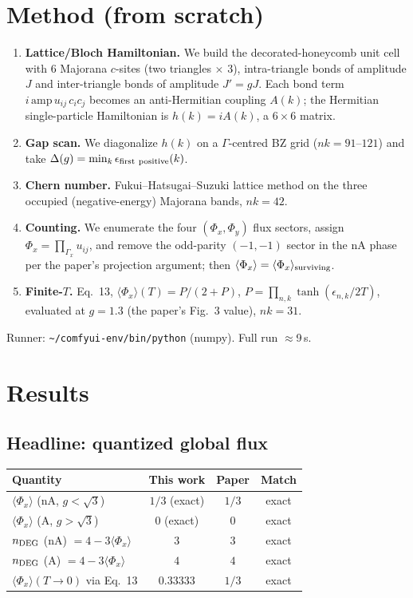 \documentclass[11pt]{article}
\begin{document}
\section{Method (from scratch)}
\begin{enumerate}
\item \textbf{Lattice/Bloch Hamiltonian.} We build the decorated-honeycomb unit
cell with 6 Majorana $c$-sites (two triangles $\times$ 3), intra-triangle bonds
of amplitude $J$ and inter-triangle bonds of amplitude $J'=gJ$. Each bond term
$i\,\text{amp}\,u_{ij}\,c_ic_j$ becomes an anti-Hermitian coupling $A(k)$; the
Hermitian single-particle Hamiltonian is $h(k)=iA(k)$, a $6\times6$ matrix.
\item \textbf{Gap scan.} We diagonalize $h(k)$ on a $\Gamma$-centred BZ grid
($nk=91$--$121$) and take $\Delta(g)=\min_k \epsilon_{\rm first\ positive}(k)$.
\item \textbf{Chern number.} Fukui--Hatsugai--Suzuki lattice method on the three
occupied (negative-energy) Majorana bands, $nk=42$.
\item \textbf{Counting.} We enumerate the four $(\Phi_x,\Phi_y)$ flux sectors,
assign $\Phi_x=\prod_{\Gamma_x}u_{ij}$, and remove the odd-parity $(-1,-1)$
sector in the nA phase per the paper's projection argument; then
$\langle\Phi_x\rangle=\langle\Phi_x\rangle_{\rm surviving}$.
\item \textbf{Finite-$T$.} Eq.~13,
$\langle\Phi_x\rangle(T)=P/(2+P)$, $P=\prod_{n,k}\tanh(\epsilon_{n,k}/2T)$,
evaluated at $g=1.3$ (the paper's Fig.~3 value), $nk=31$.
\end{enumerate}
Runner: \texttt{\~{}/comfyui-env/bin/python} (numpy). Full run $\approx$9\,s.

\section{Results}

\subsection*{Headline: quantized global flux}
\begin{table}[h]\centering
\begin{tabular}{lccc}
\toprule
Quantity & This work & Paper & Match \\
\midrule
$\langle\Phi_x\rangle$ (nA, $g<\sqrt3$) & $1/3$ (exact) & $1/3$ & exact \\
$\langle\Phi_x\rangle$ (A, $g>\sqrt3$)  & $0$ (exact)  & $0$   & exact \\
$n_{\rm DEG}$ (nA) $=4-3\langle\Phi_x\rangle$ & $3$ & $3$ & exact \\
$n_{\rm DEG}$ (A)  $=4-3\langle\Phi_x\rangle$ & $4$ & $4$ & exact \\
$\langle\Phi_x\rangle(T\!\to\!0)$ via Eq.~13 & $0.33333$ & $1/3$ & exact \\
\bottomrule
\end{tabular}
\end{table}
\end{document}

